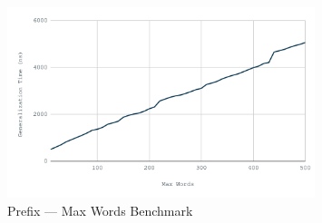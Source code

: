 \begin{figure}[H]
    \centering
    \includegraphics[width=0.8\textwidth]{images/prefix-max-words.png}
    \caption{Prefix --- Max Words Benchmark}\label{fig:prefix_max_words_bm}
\end{figure}